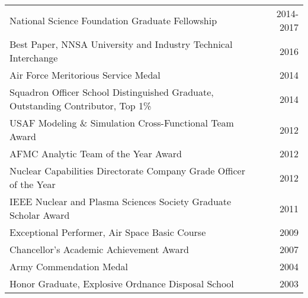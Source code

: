 \begin{tabular}{ @{} l @{\hspace{6ex}} r }
National Science Foundation Graduate Fellowship & 2014-2017 \\
Best Paper, NNSA University and Industry Technical Interchange & 2016 \\
Air Force Meritorious Service Medal & 2014 \\
Squadron Officer School Distinguished Graduate, Outstanding Contributor, Top 1\% & 2014 \\
USAF Modeling \& Simulation Cross-Functional Team Award & 2012 \\
AFMC Analytic Team of the Year Award & 2012 \\
Nuclear Capabilities Directorate Company Grade Officer of the Year & 2012 \\
IEEE Nuclear and Plasma Sciences Society Graduate Scholar Award & 2011 \\
Exceptional Performer, Air Space Basic Course & 2009 \\
Chancellor’s Academic Achievement Award	& 2007 \\
Army Commendation Medal & 2004 \\
Honor Graduate, Explosive Ordnance Disposal School & 2003 \\
\end{tabular}


